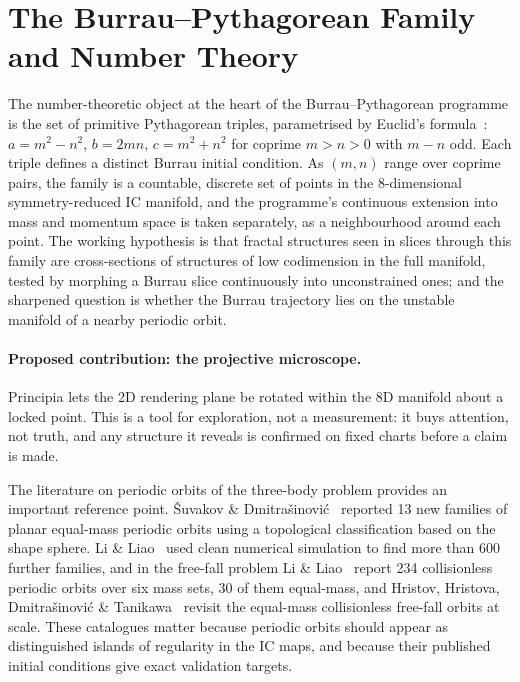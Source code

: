 \documentclass[11pt,a4paper]{article}
\begin{document}
\section{The Burrau--Pythagorean Family and Number Theory}
\label{sec:number_theory}

The number-theoretic object at the heart of the Burrau--Pythagorean programme is the set of
primitive Pythagorean triples, parametrised by Euclid's formula~\cite{hardy1979}:
$a = m^2-n^2$, $b = 2mn$, $c = m^2+n^2$ for coprime $m>n>0$ with $m-n$ odd.  Each triple defines a
distinct Burrau initial condition.  As $(m,n)$ range over coprime pairs, the family is a
countable, discrete set of points in the 8-dimensional symmetry-reduced IC manifold, and the
programme's continuous extension into mass and momentum space is taken separately, as a
neighbourhood around each point.  The working hypothesis is that fractal structures seen in
slices through this family are cross-sections of structures of low codimension in the full
manifold, tested by morphing a Burrau slice continuously into unconstrained ones; and the
sharpened question is whether the Burrau trajectory lies on the unstable manifold of a nearby
periodic orbit.

\paragraph{Proposed contribution: the projective microscope.}
Principia lets the 2D rendering plane be rotated within the 8D manifold about a locked point.  This
is a tool for exploration, not a measurement: it buys attention, not truth, and any structure it
reveals is confirmed on fixed charts before a claim is made.

The literature on periodic orbits of the three-body problem provides an important reference
point.  \v{S}uvakov \& Dmitra\v{s}inovi\'{c}~\cite{suvakov2013} reported 13 new families of planar
equal-mass periodic orbits using a topological classification based on the shape sphere.  Li \&
Liao~\cite{li2017} used clean numerical simulation to find more than 600 further families, and in
the free-fall problem Li \& Liao~\cite{li2018} report 234 collisionless periodic orbits over six
mass sets, 30 of them equal-mass, and Hristov, Hristova, Dmitra\v{s}inovi\'{c} \& Tanikawa~\cite{hristov2024}
revisit the equal-mass collisionless free-fall orbits at scale.  These catalogues matter because
periodic orbits should appear as distinguished islands of regularity in the IC maps, and because
their published initial conditions give exact validation targets.
\end{document}
